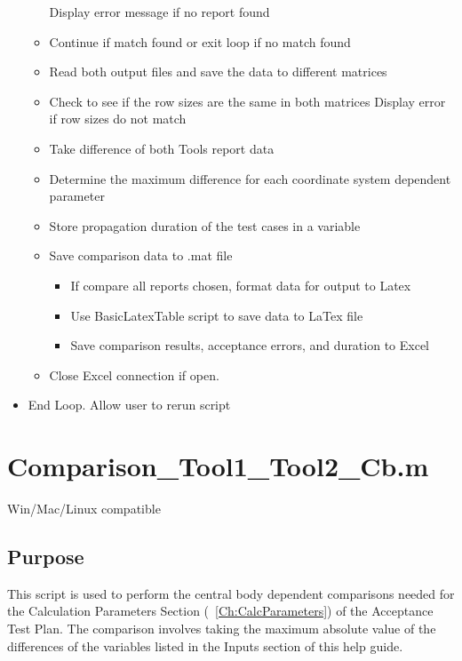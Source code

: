 \begin{itemize}
\begin{itemize}
            \subitem Display error message if no report found
        \item Continue if match found or exit loop if no match found
        \item Read both output files and save the data to different matrices
        \item Check to see if the row sizes are the same in
        both matrices
            \subitem Display error if row sizes do not match
        \item Take difference of both Tools report data
        \item Determine the maximum difference for each coordinate
        system dependent parameter
        \item Store propagation duration of the test cases in a
        variable
        \item Save comparison data to .mat file
        \begin{itemize}
            \item If compare all reports chosen, format data for
            output to Latex
            \item Use BasicLatexTable script to save data to LaTex
            file
            \item Save comparison results, acceptance errors, and
            duration to Excel
        \end{itemize}
        \item Close Excel connection if open.
    \end{itemize}
    \item End Loop. Allow user to rerun script
\end{itemize}

\section{Comparison\_Tool1\_Tool2\_Cb.m}
Win/Mac/Linux compatible
\subsection{Purpose}
This script is used to perform the central body dependent
comparisons needed for the Calculation Parameters Section
(~\ref{Ch:CalcParameters}) of the Acceptance Test Plan. The
comparison involves taking the maximum absolute value of the
differences of the variables listed in the Inputs section of this
help guide.
